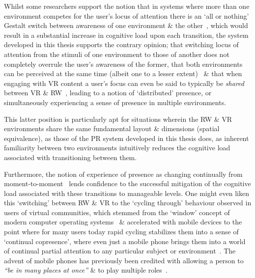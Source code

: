 

Whilst some researchers support the notion that in systems where more than one environment competes for the user's locus of attention there is an `all or nothing' Gestalt switch between awareness of one environment \& the other~\cite{Slater2002}, which would result in a substantial increase in cognitive load upon each transition, the system developed in this thesis supports the contrary opinion; that switching locus of attention from the stimuli of one environment to those of another does not completely overrule the user's awareness of the former, that both environments can be perceived at the same time (albeit one to a lesser extent)~\cite{Ijsselsteijn2001} \& that when engaging with VR content a user's focus can even be said to typically be \textit{shared} between VR \& RW~\cite{Waterworth2001}, leading to a notion of `distributed' presence, or simultaneously experiencing a sense of presence in multiple environments.

This latter position is particularly apt for situations wherein the RW \& VR environments share the same fundamental layout \& dimensions (spatial equivalence), as those of the PR system developed in this thesis does, as inherent familiarity between two environments intuitively reduces the cognitive load associated with transitioning between them.

Furthermore, the notion of experience of presence as changing continually from moment-to-moment~\cite{Heeter2003, Ijsselsteijn1998} lends confidence to the successful mitigation of the cognitive load associated with these transitions to manageable levels. One might even liken this `switching' between RW \& VR to the `cycling through' behaviour observed in users of virtual communities, which stemmed from the `window' concept of modern computer operating systems~\cite{Turkle2004} \& accelerated with mobile devices to the point where for many users today rapid cycling stabilizes them into a sense of `continual copresence', where even just a mobile phone brings them into a world of continual partial attention to any particular subject or environment~\cite{Turkle2011}. The advent of mobile phones has previously been credited with allowing a person to \textit{``be in many places at once''} \& to play multiple roles~\cite{Terashima2001}. %

